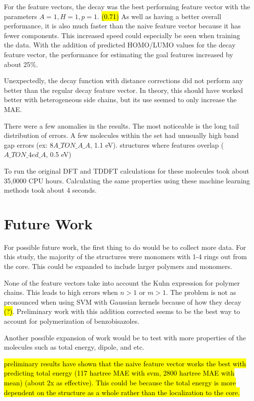 \documentclass[10pt]{article}
\begin{document}
For the feature vectors, the decay was the best performing feature vector with the parameters $A = 1, H = 1, p = 1$. \hl{(0.71)} As well as having a better overall performance, it is also much faster than the naive feature vector because it has fewer components. This increased speed could especially be seen when training the data.
With the addition of predicted HOMO/LUMO values for the decay feature vector, the performance for estimating the goal features increased by about 25\%.

Unexpectedly, the decay function with distance corrections did not perform any better than the regular decay feature vector. In theory, this should have worked better with heterogeneous side chains, but its use seemed to only increase the MAE.

There were a few anomalies in the results. The most noticeable is the long tail distribution of errors. A few molecules within the set had unusually high band gap errors (ex: $8A\_TON\_A\_A$, 1.1 eV). structures where features overlap ($A\_TON\_4ed\_A$, 0.5 eV)

To run the original DFT and TDDFT calculations for these molecules took about 35,0000 CPU hours. Calculating the same properties using these machine learning methods took about 4 seconds.


\section{Future Work}

For possible future work, the first thing to do would be to collect more data. For this study, the majority of the structures were monomers with 1-4 rings out from the core. This could be expanded to include larger polymers and monomers.

None of the feature vectors take into account the Kuhn expression for polymer chains. This leads to high errors when $n>1$ or $m>1$. The problem is not as pronounced when using SVM with Gaussian kernels because of how they decay \hl{(?)}. Preliminary work with this addition corrected seems to be the best way to account for polymerization of benzobisazoles.

Another possible expansion of work would be to test with more properties of the molecules such as total energy, dipole, and etc.

\hl{preliminary results have shown that the naive feature vector works the best with predicting total energy (117 hartree MAE with svm, 2800 hartree MAE with mean) (about 2x as effective). This could be because the total energy is more dependent on the structure as a whole rather than the localization to the core.}
\end{document}

